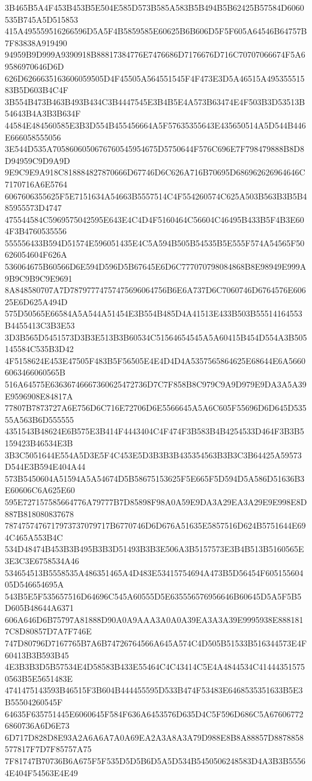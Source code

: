 {{{{{{{{{{{{{{{{{{{{{3B465B5A4F453B453B5E504E585D573B585A583B5B494B5B62425B57584D6060535B745A5D515853
415A495559516266596D5A5F4B5859585E60625B6B606D5F5F605A64546B64757B7F83838A919490
94959B9D999A9390918B88817384776E7476686D7176676D716C70707066674F5A69586970646D6D
626D6266635163606059505D4F45505A564551545F4F473E3D5A46515A49535551583B5D603B4C4F
3B554B473B463B493B434C3B4447545E3B4B5E4A573B63474E4F503B3D53513B54643B4A3B3B634F
44584E484560585E3B3D554B455456664A5F57635355643E435650514A5D544B446E666058555056
3E544D535A7058606050676760545954675D5750644F576C696E7F798479888B8D8D94959C9D9A9D
9E9C9E9A918C818884827870666D67746D6C626A716B70695D686962626964646C7170716A6E5764
6067606355625F5E7151634A54663B5557514C4F554260574C625A503B563B3B5B485955573D4747
475544584C5969575042595E643E4C4D4F5160464C56604C46495B433B5F4B3E604F3B4760535556
555556433B594D51574E596051435E4C5A594B505B54535B5E555F574A54565F50626054604F626A
536064675B60566D6E594D596D5B67645E6D6C777070798084868B8E98949E999A9B9C9B9C9E9691
8A848580707A7D78797774757475696064756B6E6A737D6C7060746D6764576E60625E6D625A494D
575D50565E66584A5A544A51454E3B554B485D4A41513E433B503B55514164553B4455413C3B3E53
3D3B565D5451573D3B3E513B3B60534C51564654545A5A60415B454D554A3B505145584C535B3D42
4F5158624E453E47505F483B5F56505E4E4D4D4A5357565864625E68644E6A56606063466060565B
516A64575E63636746667360625472736D7C7F858B8C979C9A9D979E9DA3A5A39E9596908E84817A
77807B7873727A6E756D6C716E72706D6E5566645A5A6C605F55696D6D645D53555A563B6D555555
4351543B48624E6B575E3B414F4443404C4F474F3B583B4B4254533D464F3B3B5159423B46534E3B
3B3C5051644E554A5D3E5F4C453E5D3B3B3B435354563B3B3C3B64425A59573D544E3B594E404A44
573B5450604A51594A5A54674D5B58675153625F5E665F5D594D5A586D51636B3E60606C6A625E60
595E727157585664776A79777B7D85898F98A0A59E9DA3A29EA3A29E9E998E8D887B818080837678
7874757476717973737079717B6770746D6D676A51635E5857516D624B5751644E694C465A553B4C
534D48474B453B3B495B3B3D51493B3B3E506A3B5157573E3B4B513B5160565E3E3C3E6758534A46
534654513B5558535A486351465A4D483E53415754694A473B5D56454F60515560405D546654695A
543B5E5F535657516D64696C545A60555D5E635556576956646B60645D5A5F5B5D605B48644A6371
606A646D6B75797A81888D90A0A9AAA3A0A0A39EA3A3A39E9995938E8881817C8D80857D7A7F746E
747D80796D7167765B7A6B74726764566A645A574C4D505B51533B516344573E4F60413B3B593B45
4E3B3B3D5B57534E4D58583B433E55464C4C43414C5E4A4844534C414443515750563B5E5651483E
4741475143593B46515F3B604B444455595D533B474F53483E6468535351633B5E3B55504260545F
64635F635751445E6060645F584F636A6453576D635D4C5F596D686C5A676067726860736A6D6E73
6D717D828D8E93A2A6A6A7A0A69EA2A3A8A3A79D988E8B8A88857D8878858577817F7D7F85757A75
7F81747B70736B6A675F5F535D5D5B6D5A5D534B5450506248583D4A3B3B55564E404F54563E4E49
}}}}}}}}}}}}}}}}}}}}}
